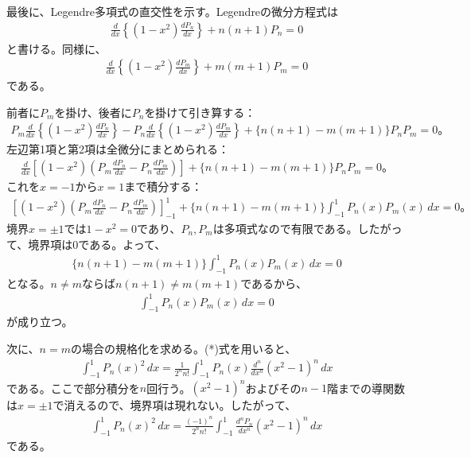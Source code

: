 \documentclass[platex,dvipdfmx,a4paper]{jsarticle}
\begin{document}
  最後に、Legendre多項式の直交性を示す。Legendreの微分方程式は
  \begin{align*}
    \frac{d}{dx}\left\{(1-x^2)\frac{dP_n}{dx}\right\}+n(n+1)P_n=0
  \end{align*}
  と書ける。同様に、
  \begin{align*}
    \frac{d}{dx}\left\{(1-x^2)\frac{dP_m}{dx}\right\}+m(m+1)P_m=0
  \end{align*}
  である。
  
  前者に$P_m$を掛け、後者に$P_n$を掛けて引き算する：
  \begin{align*}
    P_m\frac{d}{dx}\left\{(1-x^2)\frac{dP_n}{dx}\right\}
    -
    P_n\frac{d}{dx}\left\{(1-x^2)\frac{dP_m}{dx}\right\}
    +\{n(n+1)-m(m+1)\}P_nP_m=0。
  \end{align*}
  左辺第1項と第2項は全微分にまとめられる：
  \begin{align*}
    \frac{d}{dx}\left[
      (1-x^2)\left(
        P_m\frac{dP_n}{dx}-P_n\frac{dP_m}{dx}
      \right)
    \right]
    +\{n(n+1)-m(m+1)\}P_nP_m=0。
  \end{align*}
  これを$x=-1$から$x=1$まで積分する：
  \begin{align*}
    \left[
      (1-x^2)\left(
        P_m\frac{dP_n}{dx}-P_n\frac{dP_m}{dx}
      \right)
    \right]_{-1}^{1}
    +\{n(n+1)-m(m+1)\}
    \int_{-1}^{1}P_n(x)P_m(x)\,dx=0。
  \end{align*}
  境界$x=\pm1$では$1-x^2=0$であり、$P_n,P_m$は多項式なので有限である。したがって、境界項は$0$である。よって、
  \begin{align*}
    \{n(n+1)-m(m+1)\}
    \int_{-1}^{1}P_n(x)P_m(x)\,dx=0
  \end{align*}
  となる。$n\neq m$ならば$n(n+1)\neq m(m+1)$であるから、
  \begin{align*}
    \int_{-1}^{1}P_n(x)P_m(x)\,dx=0
  \end{align*}
  が成り立つ。
  
  次に、$n=m$の場合の規格化を求める。(*)式を用いると、
  \begin{align*}
    \int_{-1}^{1}P_n(x)^2\,dx
    =
    \frac{1}{2^n n!}
    \int_{-1}^{1}P_n(x)\frac{d^n}{dx^n}(x^2-1)^n\,dx
  \end{align*}
  である。ここで部分積分を$n$回行う。$(x^2-1)^n$およびその$n-1$階までの導関数は$x=\pm1$で消えるので、境界項は現れない。したがって、
  \begin{align*}
    \int_{-1}^{1}P_n(x)^2\,dx
    =
    \frac{(-1)^n}{2^n n!}
    \int_{-1}^{1}\frac{d^nP_n}{dx^n}(x^2-1)^n\,dx
  \end{align*}
  である。
  
\end{document}

